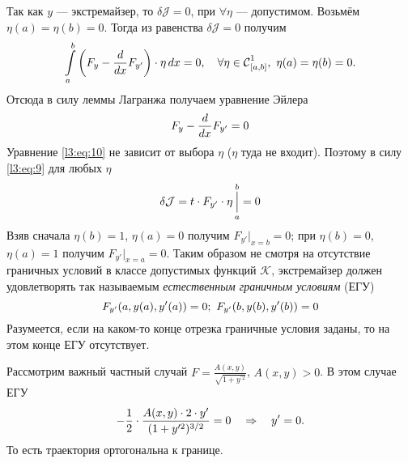 \documentclass[12pt,a4paper,openany,fleqn]{book}
\newcommand{\Cf}{\ensuremath{\mathcal{C}}}
\newcommand{\J}{\ensuremath{\mathcal{J}}}
\newcommand{\mc}[1]{\ensuremath{\mathcal{#1}}}
\newcommand{\Cfn}[2][]{\ensuremath{\Cf{\mathstrut}^{#2}_{#1}}}
\newcommand{\der}[2]{\ensuremath{\frac{d#1}{d#2}}}
\newcommand{\K}{\mc{K}}
\theoremstyle{definition}
\begin{document}
Так как $y$ --- экстремайзер, то $\delta\J=0$, при $\forall\eta$ --- допустимом. Возьмём $\eta(a)=\eta(b)=0$. Тогда из равенства $\delta\J=0$ получим 
\begin{equation*}
	\int\limits_a^b\left(F_y-\der{}{x}F_{y'}\right)\cdot\eta\,dx=0,\quad \forall\eta\in\Cfn[{[a,b]}]{1},\ \eta(a)=\eta(b)=0.
\end{equation*}
Отсюда в силу леммы Лагранжа получаем уравнение Эйлера
\begin{equation}
	\label{l3:eq:10}
	\hfill F_{y}-\der{}{x}F_{y'}=0\hfill
\end{equation}
Уравнение \eqref{l3:eq:10} не зависит от выбора $\eta$ ($\eta$  туда не входит). Поэтому в силу \eqref{l3:eq:9} для любых $\eta$
\begin{equation*}
	\hfill\delta\J=t\cdot F_{y'}\cdot\eta\mathop{\Big|}\limits_a^b=0\hfill
\end{equation*}
Взяв сначала $\eta(b)=1$, $\eta(a)=0$ получим $F_{y'}\big|_{x=b}=0$; при $\eta(b)=0$, $\eta(a)=1$ получим $F_{y'}\big|_{x=a}=0$. Таким образом не смотря на отсутствие граничных условий в классе допустимых функций \K, экстремайзер должен удовлетворять так называемым \emph{естественным граничным условиям} (ЕГУ)
\vspace{-0.4cm}
\begin{equation}
	\label{l3:eq:11}
	\hfill F_{y'}(a,y(a),y'(a))=0;\ F_{y'}(b,y(b),y'(b))=0\hfill
\end{equation}  
Разумеется, если на каком-то конце отрезка граничные условия заданы, то на этом конце ЕГУ отсутствует.

Рассмотрим важный частный случай $F=\displaystyle\frac{A(x,y)}{\sqrt{1+y^{\prime 2}}}$, $A(x,y)>0$. В этом случае ЕГУ
\begin{equation*}
	\hfill-\frac12\cdot\frac{A(x,y)\cdot2\cdot y'}{(1+y^{\prime2})^{3/2}}=0\quad\Rightarrow\quad y'=0.\hfill
\end{equation*} 
То есть траектория ортогональна к границе.
\end{document}
